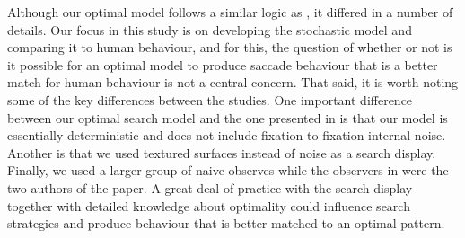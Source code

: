 \documentclass[preprint, authoryear]{elsarticle} %
\begin{document}
Although our optimal model follows a similar logic as \cite{najemnik-geisler2005,najemnik-geisler2008}, it differed in a number of details. Our focus in this study is on developing the stochastic model and comparing it to human behaviour, and for this, the question of whether or not is it possible for an optimal model to produce saccade behaviour that is a better match for human behaviour is not a central concern. That said, it is worth noting some of the key differences between the studies.  One important difference between our optimal search model and the one presented in \cite{najemnik-geisler2008} is that our model is essentially deterministic and does not include fixation-to-fixation internal noise. Another is that we used textured surfaces instead of noise as a search display. Finally, we used a larger group of naive observes while the observers in \cite{najemnik-geisler2008} were the two authors of the paper. A great deal of practice with the search display together with detailed knowledge about optimality could influence search strategies and produce behaviour that is better matched to an optimal pattern. 

\par
\end{document}
